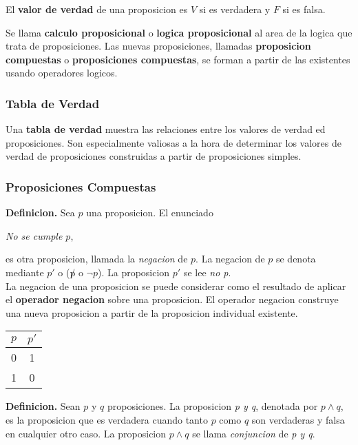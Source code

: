 \documentclass[]{article}
\begin{document}
El \textbf{valor de verdad} de una proposicion es $V$ si es verdadera y $F$ si es falsa.

Se llama \textbf{calculo proposicional} o \textbf{logica proposicional} al area de la logica que trata de proposiciones. Las nuevas proposiciones, llamadas \textbf{proposicion compuestas} o \textbf{proposiciones compuestas}, se forman a partir de las existentes usando operadores logicos.

\subsubsection*{Tabla de Verdad}

Una \textbf{tabla de verdad} muestra las relaciones entre los valores de verdad ed proposiciones. Son especialmente valiosas a la hora de determinar los valores de verdad de proposiciones construidas a partir de proposiciones simples.

\subsubsection*{Proposiciones Compuestas}

\textbf{Definicion.}  Sea $p$ una proposicion. El enunciado
		\begin{center}
			\textit{No se cumple $p$},
		\end{center}
	es otra proposicion, llamada la \textit{negacion} de $p$. La negacion de $p$ se denota mediante $p'$ o ($\not p$ o $\neg p$). La proposicion $p'$ se lee \textit{no p}.\\

	La negacion de una proposicion se puede considerar como el resultado de aplicar el \textbf{operador negacion} sobre una proposicion. El operador negacion construye una nueva proposicion a partir de la proposicion individual existente. 

	\begin{table}[H]
		\begin{center}
			\label{tab:and}
			\begin{tabular}{c|c}
				$p$ & $p'$ \\
				\hline
				0 & 1 \\
				1 & 0 
			\end{tabular}
		\end{center}
	\end{table}

\textbf{Definicion.} Sean $p$ y $q$ proposiciones. La proposicion \textit{p y q}, denotada por $p \wedge q$, es la proposicion que es verdadera cuando tanto $p$ como $q$ son verdaderas y falsa en cualquier otro caso. La proposicion $p \wedge q$ se llama \textit{conjuncion} de \textit{p y q}.\\
\end{document}
